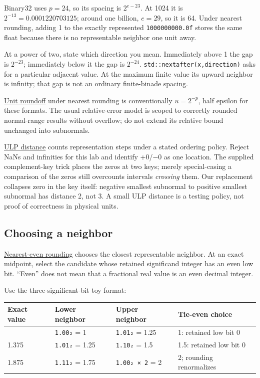 Binary32 uses \(p=24\), so its spacing is \(2^{e-23}\). At 1024 it is \(2^{-13}=0.0001220703125\); around one billion, \(e=29\), so it is 64. Under nearest rounding, adding 1 to the exactly represented \texttt{1\textquotesingle{}000\textquotesingle{}000\textquotesingle{}000.0f} stores the same float because there is no representable neighbor one unit away.

At a power of two, state which direction you mean. Immediately above 1 the gap is \(2^{-23}\); immediately below it the gap is \(2^{-24}\). \texttt{std::nextafter(x,direction)} asks for a particular adjacent value. At the maximum finite value its upward neighbor is infinity; that gap is not an ordinary finite-binade spacing.

\hyperref[appendix-bc44f7b42f42]{Unit roundoff} under nearest rounding is conventionally \(u=2^{-p}\), half epsilon for these formats. The usual relative-error model is scoped to correctly rounded normal-range results without overflow; do not extend its relative bound unchanged into subnormals.

\hyperref[appendix-deca299ae4b8]{ULP distance} counts representation steps under a stated ordering policy. Reject NaNs and infinities for this lab and identify +0/−0 as one location. The supplied complement-key trick places the zeros at two keys; merely special-casing a comparison of the zeros still overcounts intervals \emph{crossing} them. Our replacement collapses zero in the key itself: negative smallest subnormal to positive smallest subnormal has distance 2, not 3. A small ULP distance is a testing policy, not proof of correctness in physical units.

\subsection{Choosing a neighbor}\label{01-foundations-i-ch001-choosing-a-neighbor}

\hyperref[appendix-614afe1de592]{Nearest-even rounding} chooses the closest representable neighbor. At an exact midpoint, select the candidate whose retained significand integer has an even low bit. ``Even'' does not mean that a fractional real value is an even decimal integer.

Use the three-significant-bit toy format:

{\def\LTcaptype{none} %
\begin{longtable}[]{@{}llll@{}}
\toprule\noalign{}
Exact value & Lower neighbor & Upper neighbor & Tie-even choice \\
\midrule\noalign{}
\endhead
\bottomrule\noalign{}
\endlastfoot
1.125 & \texttt{1.00₂} = 1 & \texttt{1.01₂} = 1.25 & 1: retained low bit 0 \\
1.375 & \texttt{1.01₂} = 1.25 & \texttt{1.10₂} = 1.5 & 1.5: retained low bit 0 \\
1.875 & \texttt{1.11₂} = 1.75 & \texttt{1.00₂\ ×\ 2} = 2 & 2; rounding renormalizes \\
\end{longtable}
}

